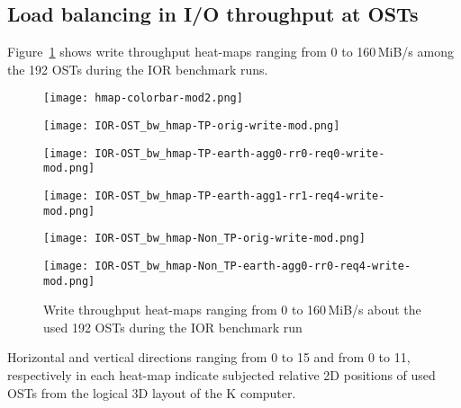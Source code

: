 \documentclass{jhps}
\begin{document}
\subsection{Load balancing in I/O throughput at OSTs}

Figure~\ref{fig:IOR_OST_BW_HMAP_WR} shows write throughput heat-maps
ranging from 0 to 160\,MiB/s
among the 192 OSTs during the IOR benchmark runs.
%
\begin{figure}[tb]
\begin{minipage}[t]{0.06\textwidth}
 \texttt{[image: hmap-colorbar-mod2.png]}
\end{minipage}
%
\noindent
\begin{minipage}[t]{0.3\textwidth}
 \centering
 \texttt{[image: IOR-OST\_bw\_hmap-TP-orig-write-mod.png]}
 \label{fig:IOR_OST_WR_ORIG}
\end{minipage}
%
\noindent
\begin{minipage}[t]{0.3\textwidth}
 \centering
 \texttt{[image: IOR-OST\_bw\_hmap-TP-earth-agg0-rr0-req0-write-mod.png]}
 \label{fig:IOR_OST_WR_AGG0_RR0_REQ0}
\end{minipage}
%
\noindent
\begin{minipage}[t]{0.3\textwidth}
 \centering
 \texttt{[image: IOR-OST\_bw\_hmap-TP-earth-agg1-rr1-req4-write-mod.png]}
 \label{fig:IOR_OST_WR_AGG1_RR1_REQ4}
\end{minipage}
%
\begin{minipage}[t]{0.3\textwidth}
 \centering
 \texttt{[image: IOR-OST\_bw\_hmap-Non\_TP-orig-write-mod.png]}
 \label{fig:IOR_OST_WR_NTP_ORIG}
\end{minipage}
%
\begin{minipage}[t]{0.3\textwidth}
 \centering
 \texttt{[image: IOR-OST\_bw\_hmap-Non\_TP-earth-agg0-rr0-req4-write-mod.png]}
 \label{fig:IOR_OST_WR_NTP_AGG0_RR0_REQ4}
\end{minipage}
%
\caption{Write throughput heat-maps ranging from 0 to 160\,MiB/s
about the used 192 OSTs during the IOR benchmark run}
\label{fig:IOR_OST_BW_HMAP_WR}
\end{figure}
%
Horizontal and vertical directions ranging from 0 to 15 and from 0 to 11,
respectively in each heat-map indicate subjected relative 2D positions
of used OSTs from the logical 3D layout of the K computer.
\end{document}
